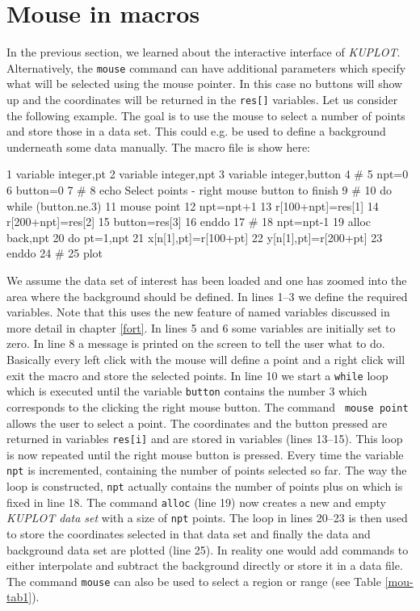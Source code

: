 \section{Mouse in macros \label{mouse-mac}}

In the previous section, we learned about the interactive interface
of {\it KUPLOT}. Alternatively, the {\tt mouse} command can have
additional parameters which specify what will be selected using the
mouse pointer. In this case no buttons will show up and the
coordinates will be returned in the {\tt res[]} variables. Let us
consider the following example. The goal is to use the mouse to
select a number of points and store those in a data set. This could
e.g. be used to define a background underneath some data manually.
The macro file is show here:
%
\begin{MacVerbatim}
    1  variable integer,pt
    2  variable integer,npt
    3  variable integer,button
    4  #
    5  npt=0
    6  button=0
    7  #
    8  echo Select points - right mouse button to finish
    9  #
   10  do while (button.ne.3)
   11    mouse point
   12    npt=npt+1
   13    r[100+npt]=res[1]
   14    r[200+npt]=res[2]
   15    button=res[3]
   16  enddo
   17  #
   18  npt=npt-1
   19  alloc back,npt
   20  do pt=1,npt
   21    x[n[1],pt]=r[100+pt]
   22    y[n[1],pt]=r[200+pt]
   23  enddo
   24  #
   25  plot
\end{MacVerbatim}
%
We assume the data set of interest has been loaded and one has
zoomed into the area where the background should be defined. In
lines 1--3 we define the required variables. Note that this uses the
new feature of named variables discussed in more detail in chapter
\ref{fort}. In lines 5 and 6 some variables are initially set to
zero. In line 8 a message is printed on the screen to tell the user
what to do. Basically every left click with the mouse will define a
point and a right click will exit the macro and store the selected
points. In line 10 we start a {\tt while} loop which is executed
until the variable {\tt button} contains the number 3 which
corresponds to the clicking the right mouse button. The command {\tt
mouse point} allows the user to select a point. The coordinates and
the button pressed are returned in variables {\tt res[i]} and are
stored in variables (lines 13--15). This loop is now repeated until
the right mouse button is pressed. Every time the variable {\tt npt}
is incremented, containing the number of points selected so far. The
way the loop is constructed, {\tt npt} actually contains the number
of points plus on which is fixed in line 18. The command {\tt alloc}
(line 19) now creates a new and empty {\it KUPLOT data set} with a
size of {\tt npt} points. The loop in lines 20--23 is then used to
store the coordinates selected in that data set and finally the data
and background data set are plotted (line 25). In reality one would
add commands to either interpolate and subtract the background
directly or store it in a data file. The command {\tt mouse} can
also be used to select a region or range (see Table \ref{mou-tab1}).

